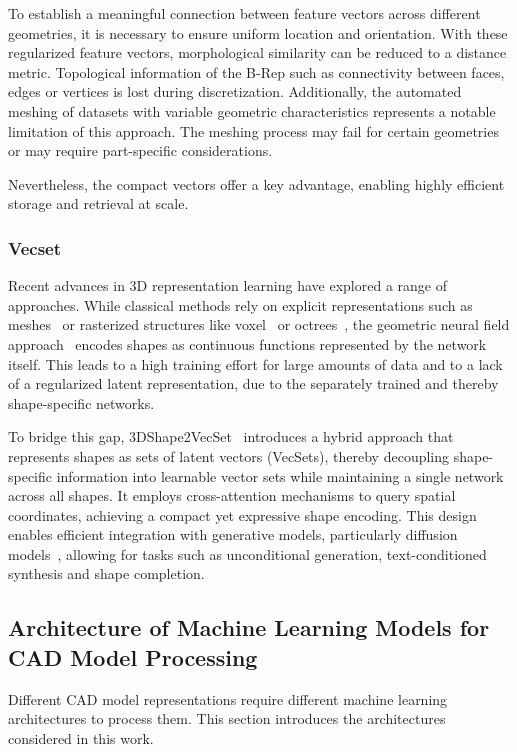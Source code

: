 \documentclass[5p,times,procedia]{elsarticle}
\begin{document}
To establish a meaningful connection between feature vectors across different geometries, it is necessary to ensure uniform location and orientation. With these regularized feature vectors, morphological similarity can be reduced to a distance metric. Topological information of the \mbox{B-Rep} such as connectivity between faces, edges or vertices is lost during discretization. Additionally, the automated meshing of datasets with variable geometric characteristics represents a notable limitation of this approach. The meshing process may fail for certain geometries or may require part-specific considerations.

Nevertheless, the compact vectors offer a key advantage, enabling highly efficient storage and retrieval at scale.

\subsubsection{Vecset}\label{sec:CAD-Representations-Vecset}
Recent advances in 3D representation learning have explored a range of approaches.
While classical methods rely on explicit representations such as meshes~\cite{bronstein2009discrete} or rasterized structures like voxel~\cite{wang2019normalnet} or octrees~\cite{tang1992octree}, the geometric neural field approach~\cite{chen2019learning,park2019deepsdf} encodes shapes as continuous functions represented by the network itself.
This leads to a high training effort for large amounts of data and to a lack of a regularized latent representation, due to the separately trained and thereby shape-specific networks.

To bridge this gap, 3DShape2VecSet~\cite{zhang20233dshape2vecset} introduces a hybrid approach that represents shapes as sets of latent vectors (VecSets), thereby decoupling shape-specific information into learnable vector sets while maintaining a single network across all shapes.
It employs cross-attention mechanisms to query spatial coordinates, achieving a compact yet expressive shape encoding.
This design enables efficient integration with generative models, particularly diffusion models~\cite{zhang20233dshape2vecset}, allowing for tasks such as unconditional generation, text-conditioned synthesis and shape completion.  

\subsection{Architecture of Machine Learning Models for CAD Model Processing}\label{sec:ML-Architectures}
Different CAD model representations require different machine learning architectures to process them.
This section introduces the architectures considered in this work. 
\end{document}
